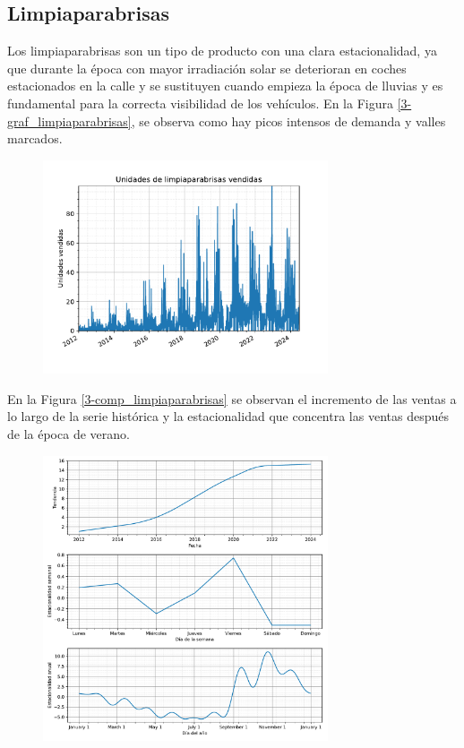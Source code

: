 \subsection{Limpiaparabrisas}

Los limpiaparabrisas son un tipo de producto con una clara estacionalidad, ya que durante la época con mayor irradiación solar se deterioran en coches estacionados en la calle y se sustituyen cuando empieza la época de lluvias y es fundamental para la correcta visibilidad de los vehículos. En la Figura \ref*{3-graf_limpiaparabrisas}, se observa como hay picos intensos de demanda y valles marcados.

\begin{figure}[H]
	{\includegraphics[width=0.75\textwidth]{imagenes/grafica_limpiaparabrisas.pdf}}
\end{figure}

En la Figura \ref*{3-comp_limpiaparabrisas} se observan el incremento de las ventas a lo largo de la serie histórica y la estacionalidad que concentra las ventas después de la época de verano.

\begin{figure}[H]
	{\includegraphics[width=0.75\textwidth]{imagenes/comps_limpiaparabrisas.pdf}}
\end{figure}


